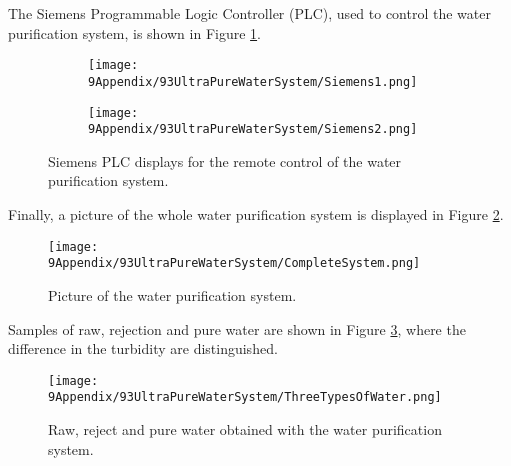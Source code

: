 The Siemens Programmable Logic Controller (PLC), used to control the water purification system, is shown in Figure \ref{fig:Siemens}.

\begin{figure}
\centering
    \begin{subfigure}[b]{0.6\textwidth}
    \centering
    \texttt{[image: 9Appendix/93UltraPureWaterSystem/Siemens1.png]}  
    \caption{}
    \end{subfigure}
    \hfill
    \begin{subfigure}[b]{0.6\textwidth}
    \centering
    \texttt{[image: 9Appendix/93UltraPureWaterSystem/Siemens2.png]}  
    \caption{}
    \end{subfigure}
 \caption{Siemens PLC displays for the remote control of the water purification system.}
 \label{fig:Siemens}
\end{figure}

Finally, a picture of the whole water purification system is displayed in Figure \ref{fig:CompleteSystem}.

\begin{figure}[htbp]
\centering
\texttt{[image: 9Appendix/93UltraPureWaterSystem/CompleteSystem.png]}
\caption{Picture of the water purification system.\label{fig:CompleteSystem}}
\end{figure}

Samples of raw, rejection and pure water are shown in Figure \ref{fig:ThreeTypesOfWater}, where the difference in the turbidity are distinguished.

\begin{figure}[htbp]
\centering
\texttt{[image: 9Appendix/93UltraPureWaterSystem/ThreeTypesOfWater.png]}
\caption{Raw, reject and pure water obtained with the water purification system.\label{fig:ThreeTypesOfWater}}
\end{figure}